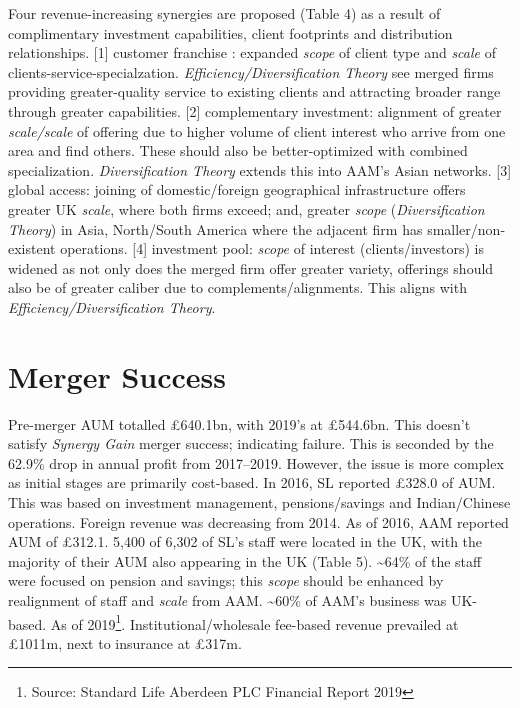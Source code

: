 \documentclass[11pt, english]{article}
\begin{document}
Four revenue-increasing synergies are proposed (Table 4) as a result of complimentary investment capabilities, client footprints and distribution relationships. [1] customer franchise : expanded \textit{scope} of client type and \textit{scale} of clients-service-specialzation. \textit{Efficiency/Diversification Theory} see merged firms providing greater-quality service to existing clients and attracting broader range through greater capabilities. [2] complementary investment: alignment of greater \textit{scale/scale} of offering due to higher volume of client interest who arrive from one area and find others. These should also be better-optimized with combined specialization. \textit{Diversification Theory} extends this into AAM's Asian networks. [3] global access: joining of domestic/foreign geographical infrastructure offers greater UK \textit{scale}, where both firms exceed; and, greater \textit{scope} (\textit{Diversification Theory}) in Asia, North/South America where the adjacent firm has smaller/non-existent operations. [4] investment pool: \textit{scope} of interest (clients/investors) is widened as not only does the merged firm offer greater variety, offerings should also be of greater caliber due to complements/alignments. This aligns with \textit{Efficiency/Diversification Theory}.

\newpage

\section{Merger Success}

Pre-merger AUM totalled \pounds640.1bn, with 2019's at \pounds544.6bn. This doesn't satisfy \textit{Synergy Gain} merger success; indicating failure. This is seconded by the 62.9\% drop in annual profit from 2017--2019. However, the issue is more complex as initial stages are primarily cost-based. In 2016, SL reported \pounds328.0 of AUM. This was based on investment management, pensions/savings and Indian/Chinese operations. Foreign revenue was decreasing from 2014. As of 2016, AAM reported AUM of \pounds312.1. 5,400 of 6,302 of SL's staff were located in the UK, with the majority of their AUM also appearing in the UK (Table 5). \~{}64\% of the staff were focused on pension and savings; this \textit{scope} should be enhanced by realignment of staff and \textit{scale} from AAM. \~{}60\% of AAM's business was UK-based. As of 2019\footnote{Source: Standard Life Aberdeen PLC Financial Report 2019}. Institutional/wholesale fee-based revenue prevailed at \pounds1011m, next to insurance at \pounds317m.\\
\end{document}
